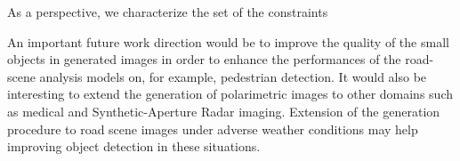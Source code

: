 As a perspective, we characterize the set of the constraints

An important future work  direction would  be to improve the quality of the small objects in generated images in order to enhance the performances of the road-scene analysis models on, for example, pedestrian detection. It would also be interesting to extend the generation of polarimetric images to other domains such as medical and Synthetic-Aperture Radar \citep{vanZyl2011} imaging. Extension of the generation procedure to road scene images under adverse weather conditions may help improving object detection in these situations.

